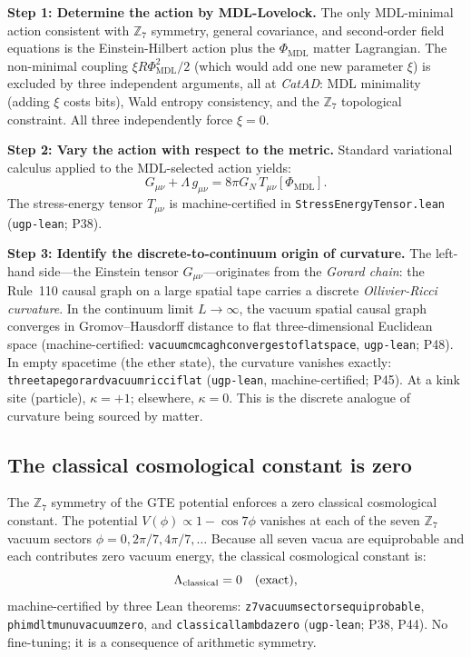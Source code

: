 \documentclass[11pt,a4paper]{article}
\newcommand{\lean}[1]{\begingroup\def\_{\textunderscore\allowbreak}\texttt{#1}\endgroup}
\newcommand{\GN}{G_{\!N}}
\newcommand{\PHIMDL}{\Phi_{\mathrm{MDL}}}
\newcommand{\ZS}{\mathbb{Z}_7}
\begin{document}
\medskip
\noindent\textbf{Step 1: Determine the action by MDL-Lovelock.}
The only MDL-minimal action consistent with $\ZS$ symmetry, general covariance,
and second-order field equations is the Einstein-Hilbert action plus the $\PHIMDL$
matter Lagrangian.  The non-minimal coupling $\xi R\PHIMDL^2/2$ (which would add
one new parameter $\xi$) is excluded by three independent arguments, all at
\textit{CatAD}: MDL minimality (adding $\xi$ costs bits), Wald entropy consistency,
and the $\ZS$ topological constraint.  All three independently force $\xi = 0$.

\medskip
\noindent\textbf{Step 2: Vary the action with respect to the metric.}
Standard variational calculus applied to the MDL-selected action yields:
\begin{equation}
  G_{\mu\nu} + \Lambda\,g_{\mu\nu} = 8\pi\GN\,T_{\mu\nu}[\PHIMDL].
  \label{eq:EFE_full}
\end{equation}
The stress-energy tensor $T_{\mu\nu}$ is machine-certified in
\lean{StressEnergyTensor.lean} (\texttt{ugp-lean}; P38).

\medskip
\noindent\textbf{Step 3: Identify the discrete-to-continuum origin of curvature.}
The left-hand side---the Einstein tensor $G_{\mu\nu}$---originates from the
\emph{Gorard chain}: the Rule~110 causal graph on a large spatial tape carries
a discrete \emph{Ollivier-Ricci curvature}.  In the continuum limit $L\to\infty$,
the vacuum spatial causal graph converges in Gromov--Hausdorff distance to flat
three-dimensional Euclidean space (machine-certified:
\lean{vacuum\_cmca\_gh\_converges\_to\_flat\_space}, \texttt{ugp-lean}; P48).  In empty spacetime
(the ether state), the curvature vanishes exactly:
\lean{three\_tape\_gorard\_vacuum\_ricci\_flat} (\texttt{ugp-lean}, machine-certified; P45).
At a kink site (particle), $\kappa = +1$; elsewhere, $\kappa = 0$.
This is the discrete analogue of curvature being sourced by matter.

\subsection{The classical cosmological constant is zero}

The $\ZS$ symmetry of the GTE potential enforces a zero classical cosmological
constant.  The potential $V(\phi) \propto 1-\cos 7\phi$ vanishes at each of the
seven $\ZS$ vacuum sectors $\phi = 0, 2\pi/7, 4\pi/7, \ldots$
Because all seven vacua are equiprobable and each contributes zero vacuum energy,
the classical cosmological constant is:
\[
  \Lambda_{\rm classical} = 0 \quad (\text{exact}),
\]
machine-certified by three Lean theorems:
\lean{z7\_vacuum\_sectors\_equiprobable},
\lean{phimdl\_tmunu\_vacuum\_zero}, and
\lean{classical\_lambda\_zero} (\texttt{ugp-lean}; P38, P44).
No fine-tuning; it is a consequence of arithmetic symmetry.
\end{document}
